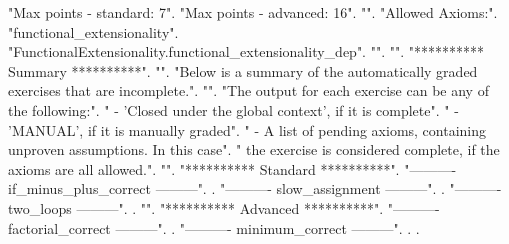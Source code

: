 \documentclass[12pt]{report}
\begin{document}
\begin{coqdoccode}
\coqdocemptyline
\coqdocnoindent
{} "Max points - standard: 7".\coqdoceol
\coqdocnoindent
{} "Max points - advanced: 16".\coqdoceol
\coqdocnoindent
{} "".\coqdoceol
\coqdocnoindent
{} "Allowed Axioms:".\coqdoceol
\coqdocnoindent
{} "functional\_extensionality".\coqdoceol
\coqdocnoindent
{} "FunctionalExtensionality.functional\_extensionality\_dep".\coqdoceol
\coqdocnoindent
{} "".\coqdoceol
\coqdocnoindent
{} "".\coqdoceol
\coqdocnoindent
{} "********** Summary **********".\coqdoceol
\coqdocnoindent
{} "".\coqdoceol
\coqdocnoindent
{} "Below is a summary of the automatically graded exercises that are incomplete.".\coqdoceol
\coqdocnoindent
{} "".\coqdoceol
\coqdocnoindent
{} "The output for each exercise can be any of the following:".\coqdoceol
\coqdocnoindent
{} "  - 'Closed under the global context', if it is complete".\coqdoceol
\coqdocnoindent
{} "  - 'MANUAL', if it is manually graded".\coqdoceol
\coqdocnoindent
{} "  - A list of pending axioms, containing unproven assumptions. In this case".\coqdoceol
\coqdocnoindent
{} "    the exercise is considered complete, if the axioms are all allowed.".\coqdoceol
\coqdocnoindent
{} "".\coqdoceol
\coqdocnoindent
{} "********** Standard **********".\coqdoceol
\coqdocnoindent
{} "---------- if\_minus\_plus\_correct ---------".\coqdoceol
\coqdocnoindent
{}  .\coqdoceol
\coqdocnoindent
{} "---------- slow\_assignment ---------".\coqdoceol
\coqdocnoindent
{}  .\coqdoceol
\coqdocnoindent
{} "---------- two\_loops ---------".\coqdoceol
\coqdocnoindent
{}  .\coqdoceol
\coqdocnoindent
{} "".\coqdoceol
\coqdocnoindent
{} "********** Advanced **********".\coqdoceol
\coqdocnoindent
{} "---------- factorial\_correct ---------".\coqdoceol
\coqdocnoindent
{}  .\coqdoceol
\coqdocnoindent
{} "---------- minimum\_correct ---------".\coqdoceol
\coqdocnoindent
{}  .\coqdoceol
\coqdocnoindent
{}.\coqdoceol
\coqdocemptyline
\coqdocemptyline
\end{coqdoccode}
\end{document}
